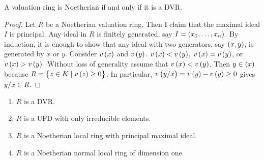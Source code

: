 \begin{theorem}
A valuation ring is Noetherian if and only if it is a DVR.
\end{theorem}

\begin{proof}
Let $ R $ be a Noetherian valuation ring. Then I claim that the maximal ideal $ I $ is principal. Any ideal in $ R $ is finitely generated, say $ I = \br{x_1, \dots, x_n} $. By induction, it is enough to show that any ideal with two generators, say $ \br{x, y} $, is generated by $ x $ or $ y $. Consider $ v\br{x} $ and $ v\br{y} $. $ v\br{x} < v\br{y} $, $ v\br{x} = v\br{y} $, or $ v\br{x} > v\br{y} $. Without loss of generality assume that $ v\br{x} < v\br{y} $. Then $ y \in \br{x} $ because $ R = \cbr{z \in K \mid v\br{z} \ge 0} $. In particular, $ v\br{y / x} = v\br{y} - v\br{y} \ge 0 $ gives $ y / x \in R $.
\end{proof}


\begin{theorem}
\hfill
\begin{enumerate}
\item $ R $ is a DVR.
\item $ R $ is a UFD with only irreducible elements.
\item $ R $ is a Noetherian local ring with principal maximal ideal.
\item $ R $ is a Noetherian normal local ring of dimension one.
\end{enumerate}
\end{theorem}


